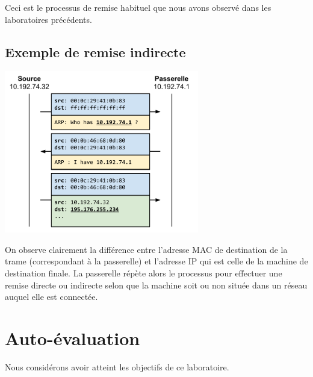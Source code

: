 \documentclass[11pt,a4paper]{article}
\begin{document}
Ceci est le processus de remise habituel que nous avons observé dans les laboratoires précédents.

\subsection{Exemple de remise indirecte}

\begin{center}
\includegraphics[width=8.5cm]{img_indirect}
\end{center}

On observe clairement la différence entre l'adresse MAC de destination de la trame (correspondant à la passerelle) et l'adresse IP qui est celle de la machine de destination finale. La passerelle répète alors le processus pour effectuer une remise directe ou indirecte selon que la machine soit ou non située dans un réseau auquel elle est connectée.

\section{Auto-évaluation}

Nous considérons avoir atteint les objectifs de ce laboratoire.
\end{document}
